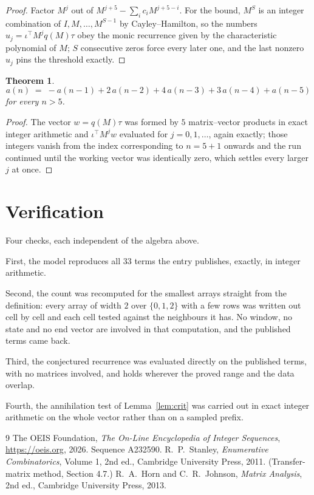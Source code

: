 \documentclass[11pt,a4paper]{article}
\theoremstyle{plain}
\newtheorem{theorem}{Theorem}
\theoremstyle{definition}
\begin{document}
\begin{proof}
Factor $M^{j}$ out of $M^{j+5}-\sum_ic_iM^{j+5-i}$. For the bound, $M^{S}$
is an integer combination of $I,M,\dots,M^{S-1}$ by Cayley--Hamilton, so the numbers
$u_j=\iota^{\!\top}M^{j}q(M)\tau$ obey the monic recurrence given by the characteristic
polynomial of $M$; $S$ consecutive zeros force every later one, and the last nonzero $u_j$
pins the threshold exactly.
\end{proof}

\begin{theorem}
\[
a(n)\;=\;-a(n-1) + 2\,a(n-2) + 4\,a(n-3) + 3\,a(n-4) + a(n-5)
\]
for every $n>5$.
\end{theorem}

\begin{proof}
The vector $w=q(M)\tau$ was formed by $5$ matrix--vector products in exact integer
arithmetic and $\iota^{\!\top}M^{j}w$ evaluated for $j=0,1,\dots$, again exactly; those
integers vanish from the index corresponding to $n=5+1$ onwards and the run continued
until the working vector was identically zero, which settles every larger $j$ at once.
\end{proof}

\section{Verification}

Four checks, each independent of the algebra above.

First, the model reproduces all $33$ terms the entry publishes, exactly, in integer
arithmetic.

Second, the count was recomputed for the smallest arrays straight from the definition: every
array of width $2$ over $\{0,1,2\}$ with a few rows was written out cell by cell and each cell
tested against the neighbours it has. No window, no state and no end vector are involved in that
computation, and the published terms came back.

Third, the conjectured recurrence was evaluated directly on the published terms, with no
matrices involved, and holds wherever the proved range and the data overlap.

Fourth, the annihilation test of Lemma~\ref{lem:crit} was carried out in exact integer
arithmetic on the whole vector rather than on a sampled prefix.

\begin{thebibliography}{9}
 The OEIS Foundation, \emph{The On-Line Encyclopedia of Integer
Sequences}, \url{https://oeis.org}, 2026. Sequence A232590.
 R.~P.~Stanley, \emph{Enumerative Combinatorics}, Volume 1, 2nd ed.,
Cambridge University Press, 2011. (Transfer-matrix method, Section 4.7.)
 R.~A.~Horn and C.~R.~Johnson, \emph{Matrix Analysis}, 2nd ed., Cambridge
University Press, 2013.
\end{thebibliography}
\end{document}
